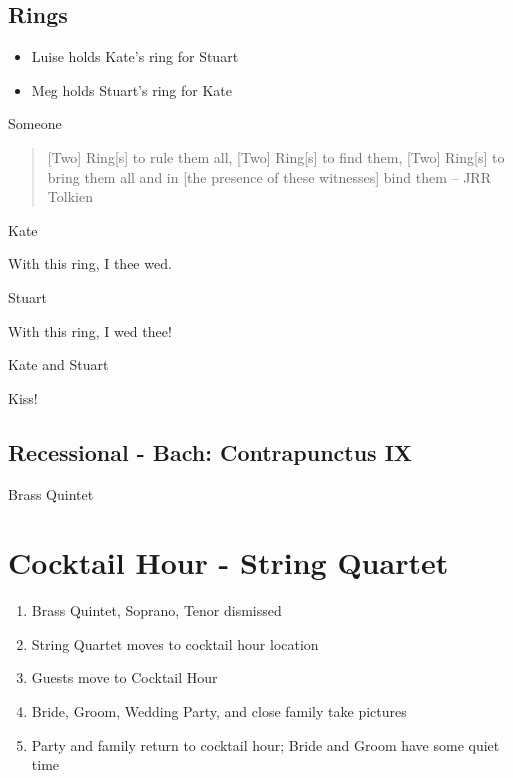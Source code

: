 \documentclass[twoside]{article}
\begin{document}
  	   \subsection{Rings}
         \begin{itemize}
           \item Luise holds Kate's ring for Stuart
           \item Meg holds Stuart's ring for Kate
         \end{itemize}
          
         \begin{center}
           Someone
         \end{center}
         \begin{quote}
  		     [Two] Ring[s] to rule them all, [Two] Ring[s] to find them,
  [Two] Ring[s] to bring them all and in [the presence of these witnesses] bind them
  	        -- JRR Tolkien
         \end{quote}

          \begin{center}
          Kate
          \end{center}
  		    With this ring, I thee wed.
          \begin{center}
          Stuart
          \end{center}
          With this ring, I wed thee!
          \begin{center}
          Kate and Stuart
          \end{center}
          Kiss!
          
  	   \subsection{Recessional - Bach: Contrapunctus IX}
         \begin{center}
           Brass Quintet
         \end{center}

  \section{Cocktail Hour - String Quartet}
    \begin{enumerate}
    	\item Brass Quintet, Soprano, Tenor dismissed
    	\item String Quartet moves to cocktail hour location
    	\item Guests move to Cocktail Hour
    	\item Bride, Groom, Wedding Party, and close family take pictures
    	\item Party and family return to cocktail hour; Bride and Groom have some quiet time
    \end{enumerate}
    
\end{document}
